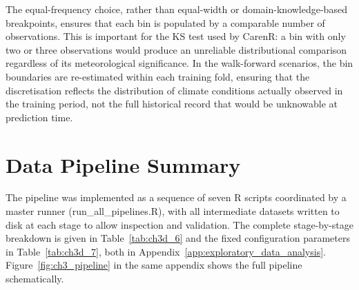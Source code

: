 The equal-frequency choice, rather than equal-width or domain-knowledge-based breakpoints, ensures that each bin is populated by a comparable number of observations. This is important for the KS test used by CarenR: a bin with only two or three observations would produce an unreliable distributional comparison regardless of its meteorological significance. In the walk-forward scenarios, the bin boundaries are re-estimated within each training fold, ensuring that the discretisation reflects the distribution of climate conditions actually observed in the training period, not the full historical record that would be unknowable at prediction time.


\section{Data Pipeline Summary}\label{sec:data_pipeline_summary}

The pipeline was implemented as a sequence of seven R scripts coordinated by a master runner (run\_all\_pipelines.R), with all intermediate datasets written to disk at each stage to allow inspection and validation. The complete stage-by-stage breakdown is given in Table~\ref{tab:ch3d_6} and the fixed configuration parameters in Table~\ref{tab:ch3d_7}, both in Appendix~\ref{app:exploratory_data_analysis}. Figure~\ref{fig:ch3_pipeline} in the same appendix shows the full pipeline schematically.


